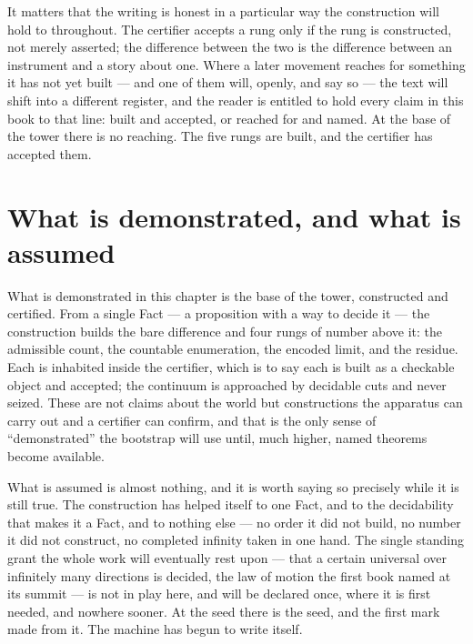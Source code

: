 It matters that the writing is honest in a particular way the construction will hold to throughout. The
certifier accepts a rung only if the rung is constructed, not merely asserted; the difference between the
two is the difference between an instrument and a story about one. Where a later movement reaches for
something it has not yet built --- and one of them will, openly, and say so --- the text will shift into a
different register, and the reader is entitled to hold every claim in this book to that line: built and
accepted, or reached for and named. At the base of the tower there is no reaching. The five rungs are
built, and the certifier has accepted them.

\section{What is demonstrated, and what is assumed}
\label{se:demonstrated-assumed-I1}

What is demonstrated in this chapter is the base of the tower, constructed and certified. From a single
Fact --- a proposition with a way to decide it --- the construction builds the bare difference and four
rungs of number above it: the admissible count, the countable enumeration, the encoded limit, and the
residue. Each is inhabited inside the certifier, which is to say each is built as a checkable object and
accepted; the continuum is approached by decidable cuts and never seized. These are not claims about the
world but constructions the apparatus can carry out and a certifier can confirm, and that is the only sense
of ``demonstrated'' the bootstrap will use until, much higher, named theorems become available.

What is assumed is almost nothing, and it is worth saying so precisely while it is still true. The
construction has helped itself to one Fact, and to the decidability that makes it a Fact, and to nothing
else --- no order it did not build, no number it did not construct, no completed infinity taken in one
hand. The single standing grant the whole work will eventually rest upon --- that a certain universal over
infinitely many directions is decided, the law of motion the first book named at its summit --- is not in
play here, and will be declared once, where it is first needed, and nowhere sooner. At the seed there is
the seed, and the first mark made from it. The machine has begun to write itself.

